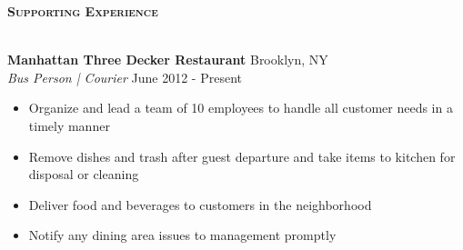 \documentclass[a4paper]{article}
\newcommand{\lineunder} {
    \vspace*{-8pt} \\
    \hspace*{-18pt} \hrulefill \\
}
\newcommand{\header} [1] {
    {\hspace*{-18pt}\vspace*{6pt} \textsc{#1}}
    \vspace*{-6pt} \lineunder
}
\begin{document}

\header{\textbf{Supporting Experience}}
\vspace{1mm}

\textbf{Manhattan Three Decker Restaurant} \hfill Brooklyn, NY\\
\textit{Bus Person | Courier} \hfill June 2012 - Present\\
\vspace{-3mm}
\begin{itemize} \itemsep -3pt
	\item Organize and lead a team of 10 employees to handle all customer needs in a timely manner
	\item Remove dishes and trash after guest departure and take items to kitchen for disposal or cleaning
    \item Deliver food and beverages to customers in the neighborhood
    \item Notify any dining area issues to management promptly
\end{itemize}


\ 
\end{document}
